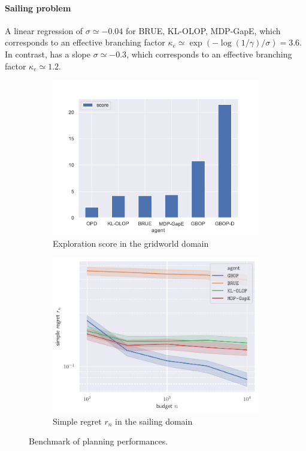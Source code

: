 \documentclass[runningheads]{llncs}
\begin{document}
\paragraph{Sailing problem}

A linear regression  of $\sigma \simeq-0.04$ for BRUE, KL-OLOP, MDP-GapE, which corresponds to an effective branching factor $\kappa_e \simeq \exp(-\log(1/\gamma)/\sigma) = 3.6$. In contrast, \GBOP has a slope $\sigma \simeq-0.3$, which corresponds to an effective branching factor $\kappa_e \simeq 1.2$.

\begin{figure}[ht]
	\begin{subfigure}[b]{0.49\textwidth}
		\includegraphics[trim = {0 0 0 0}, clip, width=\linewidth]{img/score.pdf}
		\caption{Exploration score in the gridworld domain}
		\label{fig:exploration}
	\end{subfigure}
	\begin{subfigure}[b]{0.49\textwidth}
		\includegraphics[trim = {0 0 0 0}, clip, width=\linewidth]{img/simple_regret.pdf}
		\caption{Simple regret $r_n$ in the sailing domain}
		\label{fig:sailing}
	\end{subfigure}
	\caption{Benchmark of planning performances.}
\end{figure}
\end{document}
